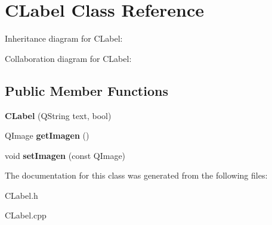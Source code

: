 \hypertarget{classCLabel}{}\section{C\+Label Class Reference}
\label{classCLabel}


Inheritance diagram for C\+Label\+:


Collaboration diagram for C\+Label\+:
\subsection*{Public Member Functions}
\begin{DoxyCompactItemize}
\item 
{\bfseries C\+Label} (Q\+String text, bool)\hypertarget{classCLabel_a6e88fa51b6c55ae59b71498cdba66ea8}{}\label{classCLabel_a6e88fa51b6c55ae59b71498cdba66ea8}

\item 
Q\+Image {\bfseries get\+Imagen} ()\hypertarget{classCLabel_a79ebc8b728db45da16020cdeb2439625}{}\label{classCLabel_a79ebc8b728db45da16020cdeb2439625}

\item 
void {\bfseries set\+Imagen} (const Q\+Image)\hypertarget{classCLabel_ac44138a6205fa3b2bc8eee63263e6fc7}{}\label{classCLabel_ac44138a6205fa3b2bc8eee63263e6fc7}

\end{DoxyCompactItemize}


The documentation for this class was generated from the following files\+:\begin{DoxyCompactItemize}
\item 
C\+Label.\+h\item 
C\+Label.\+cpp\end{DoxyCompactItemize}
